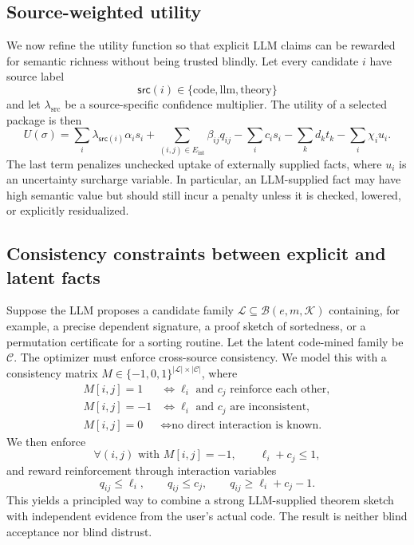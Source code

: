 \documentclass[11pt]{article}
\theoremstyle{definition}
\theoremstyle{plain}
\begin{document}
\subsection{Source-weighted utility}
We now refine the utility function so that explicit LLM claims can be rewarded
for semantic richness without being trusted blindly. Let every candidate $i$ have
source label
\[
\mathsf{src}(i) \in \{\mathrm{code}, \mathrm{llm}, \mathrm{theory}\}
\]
and let $\lambda_{\mathrm{src}}$ be a source-specific confidence multiplier. The
utility of a selected package is then
\[
U(\sigma)
= \sum_i \lambda_{\mathsf{src}(i)} \alpha_i s_i
+ \sum_{(i,j) \in E_{\mathrm{int}}} \beta_{ij} q_{ij}
- \sum_i c_i s_i
- \sum_k d_k t_k
- \sum_i \chi_i u_i.
\]
The last term penalizes unchecked uptake of externally supplied facts, where
$u_i$ is an uncertainty surcharge variable. In particular, an LLM-supplied fact
may have high semantic value but should still incur a penalty unless it is
checked, lowered, or explicitly residualized.

\subsection{Consistency constraints between explicit and latent facts}
Suppose the LLM proposes a candidate family $\mathcal{L} \subseteq
\mathcal{B}(e,m,\mathcal{K})$ containing, for example, a precise dependent
signature, a proof sketch of sortedness, or a permutation certificate for a
sorting routine. Let the latent code-mined family be $\mathcal{C}$. The optimizer
must enforce cross-source consistency. We model this with a consistency matrix
$M \in \{-1,0,1\}^{|\mathcal{L}| \times |\mathcal{C}|}$, where
\begin{align*}
M[i,j] = 1 &\iff \ell_i \text{ and } c_j \text{ reinforce each other}, \\
M[i,j] = -1 &\iff \ell_i \text{ and } c_j \text{ are inconsistent}, \\
M[i,j] = 0 &\iff \text{no direct interaction is known.}
\end{align*}
We then enforce
\[
\forall (i,j) \text{ with } M[i,j] = -1, \qquad \ell_i + c_j \le 1,
\]
and reward reinforcement through interaction variables
\[
q_{ij} \le \ell_i, \qquad q_{ij} \le c_j, \qquad q_{ij} \ge \ell_i + c_j - 1.
\]
This yields a principled way to combine a strong LLM-supplied theorem sketch with
independent evidence from the user's actual code. The result is neither blind
acceptance nor blind distrust.
\end{document}
